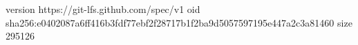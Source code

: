 version https://git-lfs.github.com/spec/v1
oid sha256:e0402087a6ff416b3fdf77ebf2f28717b1f2ba9d5057597195e447a2c3a81460
size 295126
